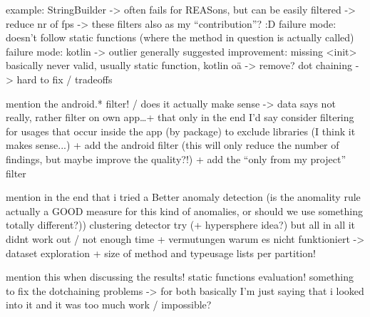 example: StringBuilder -> often fails for REASons, but can be easily filtered -> reduce nr of fps
-> these filters also as my ``contribution''? :D 
failure mode: doesn't follow static functions (where the method in question is actually called)
failure mode: kotlin -> outlier generally
suggested improvement: missing <init> basically never valid, usually static function, kotlin oä -> remove?
dot chaining -> hard to fix / tradeoffs

mention the android.* filter! / does it actually make sense -> data says not really, rather filter on own app\ldots + that only in the end I'd say
consider filtering for usages that occur inside the app (by package) to exclude libraries (I think it makes sense...)
+ add the android filter (this will only reduce the number of findings, but maybe improve the quality?!)
+ add the ``only from my project'' filter

mention in the end that i tried a 
Better anomaly detection (is the anomality rule actually a GOOD measure for this kind of anomalies, or should we use something totally different?))
    clustering detector try (+ hypersphere idea?)
    but all in all it didnt work out / not enough time
    + vermutungen warum es nicht funktioniert -> dataset exploration + size of method and typeusage lists per partition!

mention this when discussing the results!
    static functions evaluation!
    something to fix the dotchaining problems
    -> for both basically I'm just saying that i looked into it and it was too much work / impossible?

